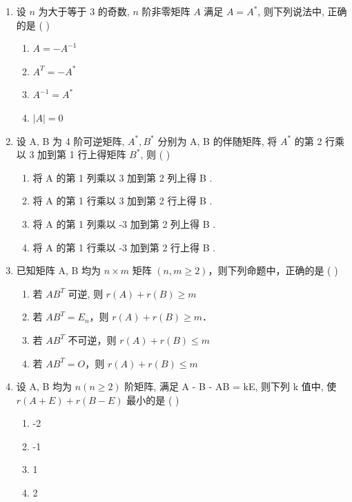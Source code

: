 \documentclass[12pt, a4paper]{ctexart}
\begin{document}
\begin{enumerate}
    \item 设 $ n $ 为大于等于 3 的奇数, $ n $ 阶非零矩阵 $ A $ 满足 $ A = A^* $, 则下列说法中, 正确的是 ( \underline{\hspace{1cm}} )
    \begin{enumerate}[label=(\Alph*)]
        \item $ A = -A^{-1} $
        \item $ A^T = -A^* $
        \item $ A^{-1} = A^* $
        \item $ |A| = 0 $
    \end{enumerate}

    \item 设 A, B 为 4 阶可逆矩阵, $ A^{*}, B^{*} $ 分别为 A, B 的伴随矩阵, 将 $ A^{*} $ 的第 2 行乘以 3 加到第 1 行上得矩阵 $ B^{*} $, 则 ( \underline{\hspace{1cm}} )
    \begin{enumerate}[label=(\Alph*)]
        \item 将 A 的第 1 列乘以 3 加到第 2 列上得 B .
        \item 将 A 的第 1 行乘以 3 加到第 2 行上得 B .
        \item 将 A 的第 1 列乘以 -3 加到第 2 列上得 B .
        \item 将 A 的第 1 行乘以 -3 加到第 2 行上得 B .
    \end{enumerate}

    \item 已知矩阵 A, B 均为 $ n \times m $ 矩阵 $ (n, m \geq 2) $，则下列命题中，正确的是 ( \underline{\hspace{1cm}} )
    \begin{enumerate}[label=(\Alph*)]
        \item 若 $ AB^{T} $ 可逆, 则 $ r(A)+r(B)\geq m $
        \item 若 $ AB^{T}=E_{n} $，则 $ r(A)+r(B)\geq m $．
        \item 若 $ AB^{T} $ 不可逆，则 $ r(A)+r(B)\leq m $
        \item 若 $ AB^{T}=O $，则 $ r(A)+r(B)\leq m $
    \end{enumerate}

    \item 设 A, B 均为 $ n (n \geq 2) $ 阶矩阵, 满足 A - B - AB = kE, 则下列 k 值中, 使 $ r(A + E) + r(B - E) $ 最小的是 ( \underline{\hspace{1cm}} )
    \begin{enumerate}[label=(\Alph*)]
        \item -2
        \item -1
        \item 1
        \item 2
    \end{enumerate}


\end{enumerate}
\end{document}
